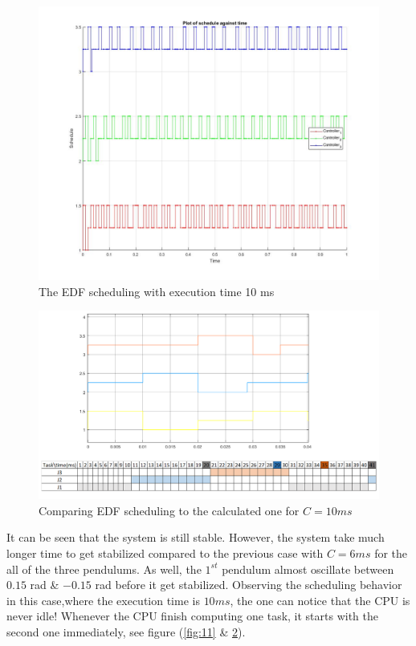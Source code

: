 \documentclass[a4paper,12pt,oneside,onecolumn]{article} %
\begin{document}
\begin{figure}[H]
    \centering
    \includegraphics[scale=0.4]{schedule10_EDF.jpg}
    \caption{The EDF scheduling with execution time 10 ms}
    \label{fig:13}
\end{figure}

\begin{figure}[H]
    \centering
    \includegraphics[scale=0.65]{Task_10.png}
    \caption{Comparing EDF scheduling to the calculated one for $C=10ms$}
    \label{fig:14}
\end{figure}


It can be seen that the system is still stable. However, the system take much longer time to get stabilized compared to the previous case with $C=6ms$ for the all of the three pendulums. As well, the $1^{st}$ pendulum almost oscillate between $0.15$ rad \& $-0.15$ rad before it get stabilized. Observing the scheduling behavior in this case,where the execution time is $10ms$, the one can notice that the CPU is never idle! Whenever the CPU finish computing one task, it starts with the second one immediately, see figure (\ref{fig:11} \& \ref{fig:14}). 
\end{document}
